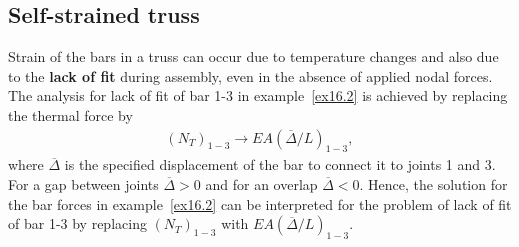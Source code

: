 \documentclass{AeroStructure-ERJohnson}
\begin{document}
\subsection{Self-strained truss}\label{sec16.1.2}

Strain of the bars in a truss can occur due to temperature changes and also due to the \textbf{lack of fit} during assembly, even in the absence of applied nodal forces. The analysis for lack of fit of bar 1-3 in example~\ref{ex16.2} is achieved by replacing the thermal force by
\begin{align*}
\left(N_{T}\right)_{1-3} \rightarrow E A(\overline{\Delta} / L)_{1-3},
\end{align*}
where $\overline{\Delta}$ is the specified displacement of the bar to connect it to joints 1 and 3. For a gap between joints $\overline{\Delta}>0$ and for an overlap $\overline{\Delta}<0$. Hence, the solution for the bar forces in example~\ref{ex16.2} can be interpreted for the problem of lack of fit of bar 1-3 by replacing $\left(N_{T}\right)_{1-3}$ with $E A(\overline{\Delta}/ L)_{1-3}$.

\pagebreak
\end{document}
